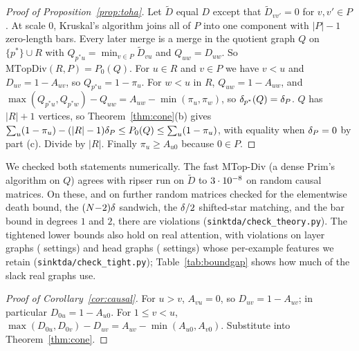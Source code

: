 \begin{proof}[Proof of Proposition~\ref{prop:toha}]
Let $\tilde D$ equal $D$ except that $\tilde D_{vv'}=0$ for $v,v'\in P$. At scale $0$, Kruskal's algorithm joins all of $P$ into one component with $|P|-1$ zero-length bars. Every later merge is a merge in the quotient graph $Q$ on $\{p^*\}\cup R$ with $Q_{p^*u}=\min_{v\in P}\tilde D_{vu}$ and $Q_{uw}=D_{uw}$. So $\mathrm{MTopDiv}(R,P)=P_0(Q)$. For $u\in R$ and $v\in P$ we have $v<u$ and $D_{uv}=1-A_{uv}$, so $Q_{p^*u}=1-\pi_u$. For $w<u$ in $R$, $Q_{uw}=1-A_{uw}$, and $\max(Q_{p^*u},Q_{p^*w})-Q_{uw}=A_{uw}-\min(\pi_u,\pi_w)$, so $\delta_{p^*}(Q)=\delta_P$. $Q$ has $|R|+1$ vertices, so Theorem~\ref{thm:cone}(b) gives $\sum_u(1-\pi_u)-(|R|-1)\delta_P\le P_0(Q)\le\sum_u(1-\pi_u)$, with equality when $\delta_P=0$ by part (c). Divide by $|R|$. Finally $\pi_u\ge A_{u0}$ because $0\in P$.
\end{proof}

We checked both statements numerically. The fast MTop-Div (a dense Prim's algorithm on $Q$) agrees with ripser run on $\tilde D$ to $3\cdot10^{-8}$ on \CheckTohaN{} random causal matrices. On these, and on \CheckDiagN{} further random matrices checked for the elementwise death bound, the $(N{-}2)\delta$ sandwich, the $\delta/2$ shifted-star matching, and the bar bound in degrees $1$ and $2$, there are \CheckViol{} violations (\texttt{sinktda/check\_theory.py}). The tightened lower bounds also hold on real attention, with \TightViol{} violations on \TightLayerGraphs{} layer graphs (\TightLayerSettings{} settings) and \TightHeadGraphs{} head graphs (\TightHeadSettings{} settings) whose per-example features we retain (\texttt{sinktda/check\_tight.py}); Table~\ref{tab:boundgap} shows how much of the slack real graphs use.

\begin{table}[h]
\centering
\small
\caption{\textbf{How much of Theorem~\ref{thm:cone}'s slack real attention uses}, on every layer graph with $\defect_0>0$ (on coned graphs both bounds hold with equality). $u_0=(\stw_0-P_0)/((N{-}2)\defect_0)\in[0,1]$ is the share of the $P_0$ sandwich used; \emph{vacuous}: share of these graphs with $(N{-}2)\defect_0\ge\stw_0$, where the lower bound says nothing; $u_1=$ longest $H_1$ bar$/\defect_0\in[0,1]$, over graphs with non-empty $H_1$. Settings whose per-example layer features we retain.}
\label{tab:boundgap}
\resizebox{\linewidth}{!}{\SinkTableBoundGap}
\end{table}

\begin{proof}[Proof of Corollary~\ref{cor:causal}]
For $u>v$, $A_{vu}=0$, so $D_{uv}=1-A_{uv}$; in particular $D_{0u}=1-A_{u0}$. For $1\le v<u$, $\max(D_{0u},D_{0v})-D_{uv}=A_{uv}-\min(A_{u0},A_{v0})$. Substitute into Theorem~\ref{thm:cone}.
\end{proof}

